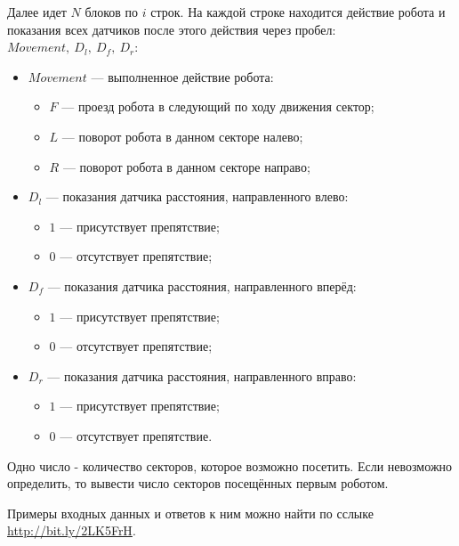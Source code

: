 Далее идет $N$ блоков по $i$ строк.
На каждой строке находится действие робота и показания всех датчиков после этого действия через пробел:
$Movement, ~ D_l,~ D_f, ~D_r$:
\begin{itemize}
    \item $Movement$ --- выполненное действие робота:
    \begin{itemize}
        \item $F$ --- проезд робота в следующий по ходу движения сектор;
        \item $L$ --- поворот робота в данном секторе налево;
        \item $R$ --- поворот робота в данном секторе направо;
    \end{itemize}
    \item $D_l$ --- показания датчика расстояния, направленного влево:
    \begin{itemize}
        \item $1$ --- присутствует препятствие;
        \item $0$ --- отсутствует препятствие;
    \end{itemize}
    \item $D_f$ --- показания датчика расстояния, направленного вперёд:
    \begin{itemize}
        \item $1$ --- присутствует препятствие;
        \item $0$ --- отсутствует препятствие;
    \end{itemize}
    \item $D_r$ --- показания датчика расстояния, направленного вправо:
    \begin{itemize}
        \item $1$ --- присутствует препятствие;
        \item $0$ --- отсутствует препятствие.
    \end{itemize}
\end{itemize}



\outputfmtSection

Одно число - количество секторов, которое возможно посетить. Если невозможно определить, то вывести число
секторов посещённых первым роботом.


\exampleSection

Примеры входных данных и ответов к ним можно найти по сслыке \url{http://bit.ly/2LK5FrH}.





